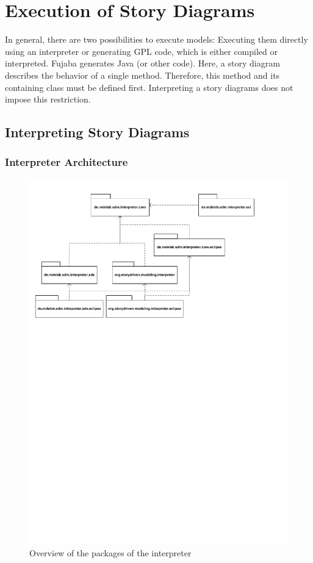 \chapter{Execution of Story Diagrams}

In general, there are two possibilities to execute models: Executing them directly using an interpreter\cite{GHS09} or generating GPL code, which is either compiled or interpreted. Fujaba generates Java (or other code). Here, a story diagram describes the behavior of a single method. Therefore, this method and its containing class must be defined first. Interpreting a story diagrams does not  impose this restriction. 



\section{Interpreting Story Diagrams}

\subsection{Interpreter Architecture}

\begin{figure}[htb]
  \centering
  \includegraphics[width=1.0\columnwidth]{./figures/interpreter_packages.pdf}
  \caption{Overview of the packages of the interpreter}
  \label{fig:interpreter_packages}
\end{figure}

